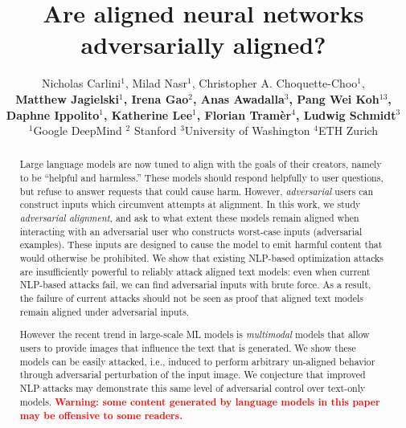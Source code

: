 \documentclass{article}
\title{Are aligned neural networks adversarially aligned?}
\author {%
{Nicholas Carlini$^1$, Milad Nasr$^1$, Christopher A. Choquette-Choo$^1$,} \\
\textbf{Matthew Jagielski$^1$, Irena Gao$^2$, Anas Awadalla$^3$, Pang Wei Koh$^{13}$,} \\
\textbf{Daphne Ippolito$^1$, Katherine Lee$^1$, Florian Tramèr$^4$, Ludwig Schmidt$^3$} \\
$^1$Google DeepMind \quad $^2$ Stanford \quad $^3$University of Washington \quad $^4$ETH Zurich
}
\date{}
\newcommand{\pw}[1]{\textcolor{blue}{[PW: #1]}}
\begin{document}
\maketitle

\begin{abstract}
    Large language models are now tuned to align with the goals of their creators, namely to be ``helpful and harmless.''
    These models should respond helpfully to user questions,
    but refuse to answer requests that could cause
    harm.
    However, \emph{adversarial} users can construct inputs which circumvent attempts at alignment.
    In this work, we study \emph{adversarial alignment}, and ask to what extent these models remain aligned when
    interacting with an adversarial user who constructs
    worst-case inputs (adversarial examples).
    These inputs are designed to cause the model to emit harmful
    content that would otherwise be prohibited.
    We show that existing NLP-based optimization attacks are insufficiently
    powerful to reliably attack aligned text models: even when current NLP-based attacks fail, we can find adversarial inputs with brute force.
    As a result, the failure of current attacks should not be seen as proof that aligned text models remain aligned under adversarial inputs.
    
    However the recent trend in large-scale ML models is \emph{multimodal} models that allow users to provide images that influence the text that is generated.
    We show these models can be easily attacked, i.e., induced to perform arbitrary un-aligned behavior through adversarial perturbation of the input image.
    We conjecture that improved NLP attacks may demonstrate this
    same level of adversarial control over text-only models.
    \textcolor{red}{\textbf{Warning: some content generated by language models in this paper may be offensive to some readers.}
      }
      

\end{abstract}
\end{document}
